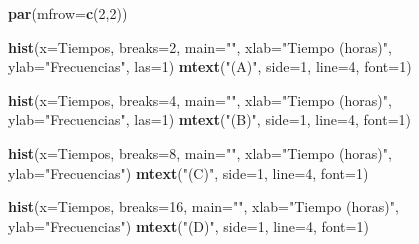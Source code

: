 \documentclass[10pt,]{krantz}
\makeatletter
\newenvironment{Shaded}{\begin{snugshade}}{\end{snugshade}}
\newcommand{\KeywordTok}[1]{\textcolor[rgb]{0.13,0.29,0.53}{\textbf{{#1}}}}
\newcommand{\DataTypeTok}[1]{\textcolor[rgb]{0.13,0.29,0.53}{{#1}}}
\newcommand{\DecValTok}[1]{\textcolor[rgb]{0.00,0.00,0.81}{{#1}}}
\newcommand{\StringTok}[1]{\textcolor[rgb]{0.31,0.60,0.02}{{#1}}}
\newcommand{\NormalTok}[1]{{#1}}
\newenvironment{kframe}{%
\medskip{}
\setlength{\fboxsep}{.8em}
 \def\at@end@of@kframe{}%
 \ifinner\ifhmode%
  \def\at@end@of@kframe{\end{minipage}}%
  \begin{minipage}{\columnwidth}%
 \fi\fi%
 \def\FrameCommand##1{\hskip\@totalleftmargin \hskip-\fboxsep
 \colorbox{shadecolor}{##1}\hskip-\fboxsep
     \hskip-\linewidth \hskip-\@totalleftmargin \hskip\columnwidth}%
 \MakeFramed {\advance\hsize-\width
   \@totalleftmargin\z@ \linewidth\hsize
   \@setminipage}}%
 {\par\unskip\endMakeFramed%
 \at@end@of@kframe}
\renewenvironment{Shaded}{\begin{kframe}}{\end{kframe}}
\makeatother
\begin{document}
\begin{Shaded}
\begin{Highlighting}[]
\KeywordTok{par}\NormalTok{(}\DataTypeTok{mfrow=}\KeywordTok{c}\NormalTok{(}\DecValTok{2}\NormalTok{,}\DecValTok{2}\NormalTok{))}

\KeywordTok{hist}\NormalTok{(}\DataTypeTok{x=}\NormalTok{Tiempos, }\DataTypeTok{breaks=}\DecValTok{2}\NormalTok{, }\DataTypeTok{main=}\StringTok{""}\NormalTok{, }\DataTypeTok{xlab=}\StringTok{"Tiempo (horas)"}\NormalTok{,}
     \DataTypeTok{ylab=}\StringTok{"Frecuencias"}\NormalTok{, }\DataTypeTok{las=}\DecValTok{1}\NormalTok{)}
\KeywordTok{mtext}\NormalTok{(}\StringTok{"(A)"}\NormalTok{, }\DataTypeTok{side=}\DecValTok{1}\NormalTok{, }\DataTypeTok{line=}\DecValTok{4}\NormalTok{, }\DataTypeTok{font=}\DecValTok{1}\NormalTok{)}

\KeywordTok{hist}\NormalTok{(}\DataTypeTok{x=}\NormalTok{Tiempos, }\DataTypeTok{breaks=}\DecValTok{4}\NormalTok{, }\DataTypeTok{main=}\StringTok{""}\NormalTok{, }\DataTypeTok{xlab=}\StringTok{"Tiempo (horas)"}\NormalTok{,}
     \DataTypeTok{ylab=}\StringTok{"Frecuencias"}\NormalTok{, }\DataTypeTok{las=}\DecValTok{1}\NormalTok{)}
\KeywordTok{mtext}\NormalTok{(}\StringTok{"(B)"}\NormalTok{, }\DataTypeTok{side=}\DecValTok{1}\NormalTok{, }\DataTypeTok{line=}\DecValTok{4}\NormalTok{, }\DataTypeTok{font=}\DecValTok{1}\NormalTok{)}

\KeywordTok{hist}\NormalTok{(}\DataTypeTok{x=}\NormalTok{Tiempos, }\DataTypeTok{breaks=}\DecValTok{8}\NormalTok{, }\DataTypeTok{main=}\StringTok{""}\NormalTok{, }\DataTypeTok{xlab=}\StringTok{"Tiempo (horas)"}\NormalTok{,}
     \DataTypeTok{ylab=}\StringTok{"Frecuencias"}\NormalTok{)}
\KeywordTok{mtext}\NormalTok{(}\StringTok{"(C)"}\NormalTok{, }\DataTypeTok{side=}\DecValTok{1}\NormalTok{, }\DataTypeTok{line=}\DecValTok{4}\NormalTok{, }\DataTypeTok{font=}\DecValTok{1}\NormalTok{)}

\KeywordTok{hist}\NormalTok{(}\DataTypeTok{x=}\NormalTok{Tiempos, }\DataTypeTok{breaks=}\DecValTok{16}\NormalTok{, }\DataTypeTok{main=}\StringTok{""}\NormalTok{, }\DataTypeTok{xlab=}\StringTok{"Tiempo (horas)"}\NormalTok{,}
     \DataTypeTok{ylab=}\StringTok{"Frecuencias"}\NormalTok{)}
\KeywordTok{mtext}\NormalTok{(}\StringTok{"(D)"}\NormalTok{, }\DataTypeTok{side=}\DecValTok{1}\NormalTok{, }\DataTypeTok{line=}\DecValTok{4}\NormalTok{, }\DataTypeTok{font=}\DecValTok{1}\NormalTok{)}
\end{Highlighting}
\end{Shaded}
\end{document}
